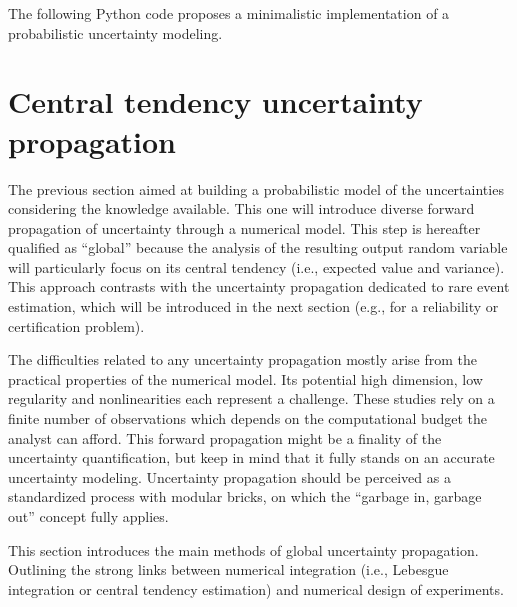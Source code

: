 \begin{otexample}
    The following Python code proposes a minimalistic \ot implementation of a probabilistic uncertainty modeling. 
    \lstset{style=mystyle, language=python}
\end{otexample}


\section{Central tendency uncertainty propagation} \label{sec:central_propagation}

The previous section aimed at building a probabilistic model of the uncertainties considering the knowledge available.
This one will introduce diverse forward propagation of uncertainty through a numerical model. 
This step is hereafter qualified as ``global'' because the analysis of the resulting output random variable will particularly focus on its central tendency (i.e., expected value and variance).
This approach contrasts with the uncertainty propagation dedicated to rare event estimation, which will be introduced in the next section (e.g., for a reliability or certification problem).

The difficulties related to any uncertainty propagation mostly arise from the practical properties of the numerical model. 
Its potential high dimension, low regularity and nonlinearities each represent a challenge. 
These studies rely on a finite number of observations which depends on the computational budget the analyst can afford.   
This forward propagation might be a finality of the uncertainty quantification, but keep in mind that it fully stands on an accurate uncertainty modeling.
Uncertainty propagation should be perceived as a standardized process with modular bricks, on which the ``garbage in, garbage out'' concept fully applies.

This section introduces the main methods of global uncertainty propagation. 
Outlining the strong links between numerical integration (i.e., Lebesgue integration or central tendency estimation) and numerical design of experiments. 


